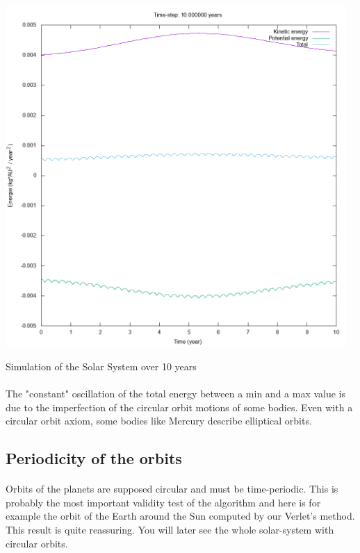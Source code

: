 \documentclass[a4paper, twoside, 11pt]{report}
\theoremstyle{theorem}
\theoremstyle{remark}
\theoremstyle{exemple}
\begin{document}
                    \begin{center}
            \includegraphics[width=13cm,height=13cm]{energie}
        \end{center}
        \begin{center}
            Simulation of the Solar System over 10 years
        \end{center}
        
        	\paragraph{}The "constant" oscillation of the total energy between a min and a max value is due to the imperfection of the circular orbit motions of some bodies. Even with a circular orbit axiom, some bodies like Mercury describe elliptical orbits.
                
                
           \subsection{Periodicity of the orbits}
           
           		\paragraph{}Orbits of the planets are supposed circular and must be time-periodic. This is probably the most important validity test of the algorithm and here is for example the orbit of the Earth around the Sun computed by our Verlet's method. This result is quite reassuring. You will later see the whole solar-system with circular orbits.
          
\end{document}
